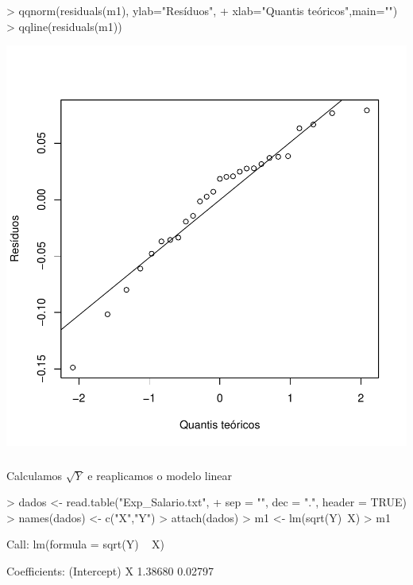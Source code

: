 \documentclass[14pt,aspectratio=1610]{beamer}
\begin{document}
% 
% 
\begin{frame}[fragile]{}
\frametitle{ }
\begin{block}{}
\justifying


\begin{Schunk}
\begin{Sinput}
> qqnorm(residuals(m1), ylab="Resíduos",
+        xlab="Quantis teóricos",main="")
> qqline(residuals(m1))
\end{Sinput}
\end{Schunk}
\end{block}

\begin{block}{}
\vspace{-1cm}
\begin{center}
\includegraphics{Aula17-028}
\end{center}
\end{block}
\end{frame}

\begin{frame}[fragile]{}
\frametitle{ }
\begin{block}{Calculamos $\sqrt{Y}$ e reaplicamos o modelo linear}
\begin{Schunk}
\begin{Sinput}
> dados <- read.table("Exp_Salario.txt",
+                     sep = "", dec = ".", header = TRUE)
> names(dados) <- c("X","Y")
> attach(dados)
> m1 <- lm(sqrt(Y)~X)
> m1
\end{Sinput}
\begin{Soutput}
Call:
lm(formula = sqrt(Y) ~ X)

Coefficients:
(Intercept)            X  
    1.38680      0.02797  
\end{Soutput}
\end{Schunk}
\end{block}
\end{frame}
\end{document}
